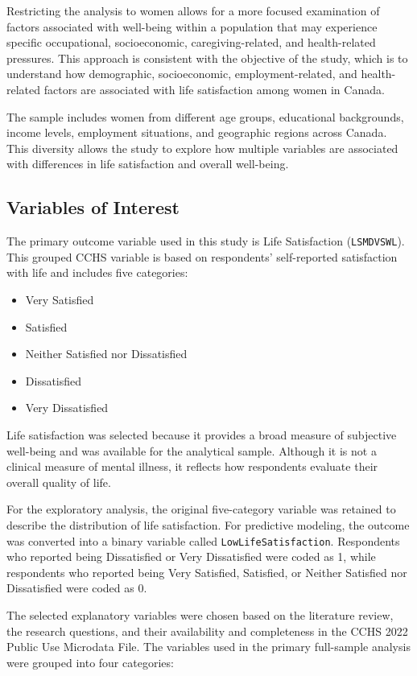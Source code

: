 \documentclass[12pt]{article}
\begin{document}
Restricting the analysis to women allows for a more focused examination of factors associated with well-being within a population that may experience specific occupational, socioeconomic, caregiving-related, and health-related pressures. This approach is consistent with the objective of the study, which is to understand how demographic, socioeconomic, employment-related, and health-related factors are associated with life satisfaction among women in Canada.

The sample includes women from different age groups, educational backgrounds, income levels, employment situations, and geographic regions across Canada. This diversity allows the study to explore how multiple variables are associated with differences in life satisfaction and overall well-being.

\subsection{Variables of Interest}

The primary outcome variable used in this study is Life Satisfaction (\texttt{LSMDVSWL}). This grouped CCHS variable is based on respondents' self-reported satisfaction with life and includes five categories:

\begin{itemize}
\item Very Satisfied
\item Satisfied
\item Neither Satisfied nor Dissatisfied
\item Dissatisfied
\item Very Dissatisfied
\end{itemize}

Life satisfaction was selected because it provides a broad measure of subjective well-being and was available for the analytical sample. Although it is not a clinical measure of mental illness, it reflects how respondents evaluate their overall quality of life.

For the exploratory analysis, the original five-category variable was retained to describe the distribution of life satisfaction. For predictive modeling, the outcome was converted into a binary variable called \texttt{LowLifeSatisfaction}. Respondents who reported being Dissatisfied or Very Dissatisfied were coded as 1, while respondents who reported being Very Satisfied, Satisfied, or Neither Satisfied nor Dissatisfied were coded as 0.

The selected explanatory variables were chosen based on the literature review, the research questions, and their availability and completeness in the CCHS 2022 Public Use Microdata File. The variables used in the primary full-sample analysis were grouped into four categories:
\end{document}
